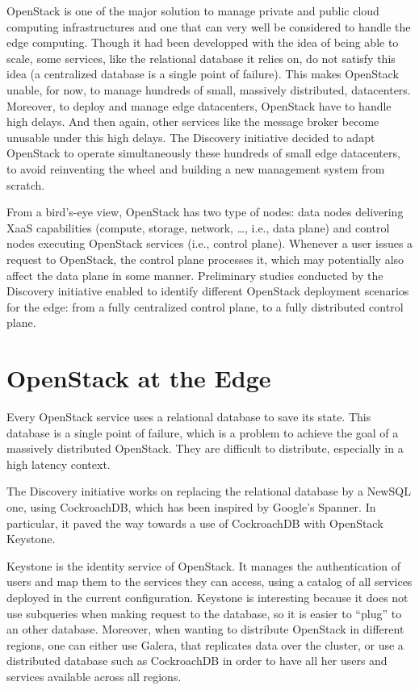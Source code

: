 OpenStack is one of the major solution to manage private and public cloud computing infrastructures and one that can very well be considered to handle the edge computing. Though it had been developped with the idea of being able to scale, some services, like the relational database it relies on, do not satisfy this idea (a centralized database is a single point of failure). This makes OpenStack unable, for now, to manage hundreds of small, massively distributed, datacenters. Moreover, to deploy and manage edge datacenters, OpenStack have to handle high delays. And then again, other services like the message broker become unusable under this high delays. The Discovery initiative decided to adapt OpenStack to operate simultaneously these hundreds of small edge datacenters, to avoid reinventing the wheel and building a new management system from scratch.

From a bird’s-eye view, OpenStack has two type of nodes: data nodes delivering XaaS capabilities (compute, storage, network, \dots, i.e., data plane) and control nodes executing OpenStack services (i.e., control plane). Whenever a user issues a request to OpenStack, the control plane processes it, which may potentially also affect the data plane in some manner. Preliminary studies conducted by the Discovery initiative enabled to identify different OpenStack deployment scenarios for the edge: from a fully centralized control plane, to a fully distributed control plane\cite{cherrueau:hal-01812747}.


\section{OpenStack at the Edge}

Every OpenStack service uses a relational database to save its state. This database is a single point of failure, which is a problem to achieve the goal of a massively distributed OpenStack. They are difficult to distribute, especially in a high latency context.

The Discovery initiative works on replacing the relational database by a NewSQL one, using CockroachDB, which has been inspired by Google's Spanner\cite{CRDB:HLC}. In particular, it paved the way towards a use of CockroachDB with OpenStack Keystone.

Keystone is the identity service of OpenStack. It manages the authentication of users and map them to the services they can access, using a catalog of all services deployed in the current configuration. Keystone is interesting because it does not use subqueries when making request to the database, so it is easier to ``plug'' to an other database. Moreover, when wanting to distribute OpenStack in different regions, one can either use Galera, that replicates data over the cluster, or use a distributed database such as CockroachDB in order to have all her users and services available across all regions.

